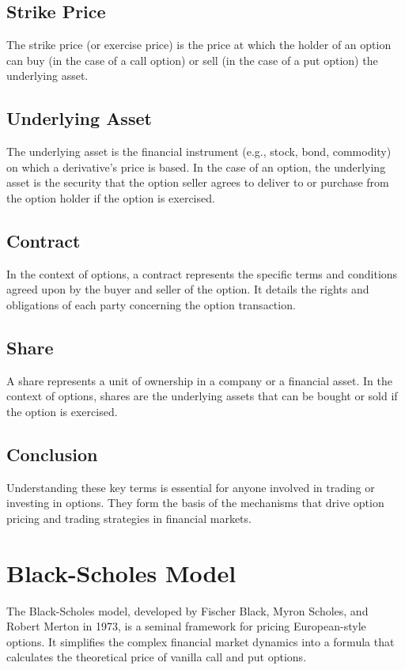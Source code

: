 \documentclass{article}
\begin{document}
\subsection*{Strike Price}
The strike price (or exercise price) is the price at which the holder of an option can buy (in the case of a call option) or sell (in the case of a put option) the underlying asset.

\subsection*{Underlying Asset}
The underlying asset is the financial instrument (e.g., stock, bond, commodity) on which a derivative's price is based. In the case of an option, the underlying asset is the security that the option seller agrees to deliver to or purchase from the option holder if the option is exercised.

\subsection*{Contract}
In the context of options, a contract represents the specific terms and conditions agreed upon by the buyer and seller of the option. It details the rights and obligations of each party concerning the option transaction.

\subsection*{Share}
A share represents a unit of ownership in a company or a financial asset. In the context of options, shares are the underlying assets that can be bought or sold if the option is exercised.

\subsection*{Conclusion}
Understanding these key terms is essential for anyone involved in trading or investing in options. They form the basis of the mechanisms that drive option pricing and trading strategies in financial markets.

\newpage
\section{Black-Scholes Model}
The Black-Scholes model, developed by Fischer Black, Myron Scholes, and Robert Merton in 1973, is a seminal framework for pricing European-style options. It simplifies the complex financial market dynamics into a formula that calculates the theoretical price of vanilla call and put options.
\end{document}
